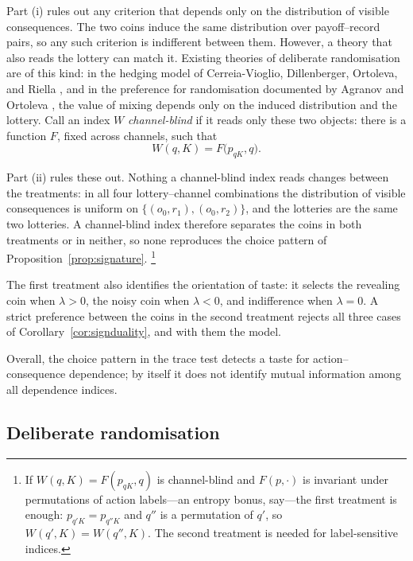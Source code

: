 \documentclass[11pt,a4paper]{article}
\theoremstyle{definition}
\newcommand{\1}{\mathbf 1}
\begin{document}
Part \textup{(i)} rules out any criterion that depends only on the distribution of visible consequences.
The two coins induce the same distribution over payoff--record pairs, so any such criterion is indifferent between them. However, a theory that also reads the lottery can
match it.  Existing theories of deliberate randomisation are of this kind: in the hedging model
of Cerreia-Vioglio, Dillenberger, Ortoleva, and Riella \cite{CerreiaVioglioDillenbergerOrtolevaRiella2019}, and
in the preference for randomisation documented by Agranov and Ortoleva \cite{AgranovOrtoleva2017}, the value of
mixing depends only on the induced distribution and the lottery.  Call an index $W$ \emph{channel-blind} if it
reads only these two objects: there is a function $F$, fixed across channels, such that
\[
 W(q,K)=F\bigl(p_{qK},q\bigr).
\]

Part \textup{(ii)}  rules these out.  Nothing a channel-blind index reads changes between the treatments: in
all four lottery--channel combinations the distribution of visible consequences is uniform on
$\{(o_0,r_1),(o_0,r_2)\}$, and the lotteries are the same two lotteries.  A channel-blind index therefore
separates the coins in both treatments or in neither, so none reproduces the choice pattern of
Proposition~\ref{prop:signature}.%
\footnote{If $W(q,K)=F(p_{qK},q)$ is channel-blind and $F(p,\cdot)$ is invariant under permutations of action labels---an entropy bonus, say---the first
treatment is enough: $p_{q'K}=p_{q''K}$ and $q''$ is a permutation of $q'$, so $W(q',K)=W(q'',K)$.  The second treatment is needed for label-sensitive indices.}

The first treatment also identifies the orientation of taste: it selects the revealing coin when $\lambda>0$,
the noisy coin when $\lambda<0$, and indifference when $\lambda=0$.  A strict preference between the coins in the second treatment rejects all three cases of Corollary~\ref{cor:signduality}, and with them the model.

Overall, the choice pattern in the trace test detects a taste for action--consequence dependence; by itself it does not identify mutual information among all dependence indices.

\subsection{Deliberate randomisation}\label{sec:randomisation}
\end{document}
